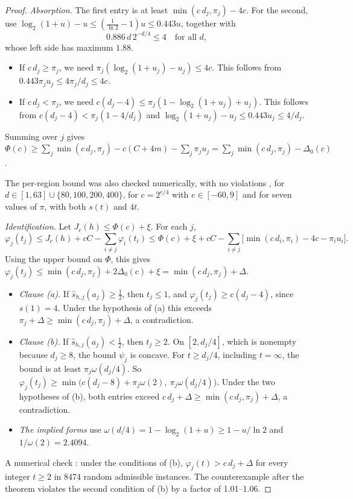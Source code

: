 \begin{proof}
\emph{Absorption.} The first entry is at least $\min(c\,d_j,\pi_j)-4c$. For the second, use $\log_2(1+u)-u\le(\frac1{\ln2}-1)u\le0.443u$, together with
\[
0.886\,d\,2^{-d/4}\le4\quad\text{for all }d,
\]
whose left side has maximum $1.88$.
\begin{itemize}
\item If $c\,d_j\ge\pi_j$, we need $\pi_j(\log_2(1+u_j)-u_j)\le4c$. This follows from $0.443\pi_ju_j\le4\pi_j/d_j\le4c$.
\item If $c\,d_j<\pi_j$, we need $c(d_j-4)\le\pi_j(1-\log_2(1+u_j)+u_j)$. This follows from $c(d_j-4)<\pi_j(1-4/d_j)$ and $\log_2(1+u_j)-u_j\le0.443u_j\le4/d_j$.
\end{itemize}
Summing over $j$ gives $\Phi(c)\ge\sum_j\min(c\,d_j,\pi_j)-c(C+4m)-\sum_j\pi_ju_j=\sum_j\min(c\,d_j,\pi_j)-\Delta_0(c)$.

The per-region bound was also checked numerically, with no violations , for $d\in[1,63]\cup\{80,100,200,400\}$, for $c=2^{e/4}$ with $e\in[-60,9]$ and for seven values of $\pi$, with both $s(t)$ and $4t$.

\emph{Identification.} Let $J_c(h)\le\Phi(c)+\xi$. For each $j$,
\[
\varphi_j(t_j)\le J_c(h)+cC-\sum_{i\neq j}\varphi_i(t_i)\le\Phi(c)+\xi+cC-\sum_{i\neq j}\big[\min(c\,d_i,\pi_i)-4c-\pi_iu_i\big].
\]
Using the upper bound on $\Phi$, this gives $\varphi_j(t_j)\le\min(c\,d_j,\pi_j)+2\Delta_0(c)+\xi=\min(c\,d_j,\pi_j)+\Delta$.
\begin{itemize}
\item \emph{Clause (a).} If $\hat s_{h,j}(a_j)\ge\frac12$, then $t_j\le1$, and $\varphi_j(t_j)\ge c(d_j-4)$, since $s(1)=4$. Under the hypothesis of (a) this exceeds $\pi_j+\Delta\ge\min(c\,d_j,\pi_j)+\Delta$, a contradiction.
\item \emph{Clause (b).} If $\hat s_{h,j}(a_j)<\frac12$, then $t_j\ge2$. On $[2,d_j/4]$, which is nonempty because $d_j\ge8$, the bound $\psi_j$ is concave. For $t\ge d_j/4$, including $t=\infty$, the bound is at least $\pi_j\omega(d_j/4)$. So $\varphi_j(t_j)\ge\min\big(c(d_j-8)+\pi_j\omega(2),\ \pi_j\omega(d_j/4)\big)$. Under the two hypotheses of (b), both entries exceed $c\,d_j+\Delta\ge\min(c\,d_j,\pi_j)+\Delta$, a contradiction.
\item \emph{The implied forms} use $\omega(d/4)=1-\log_2(1+u)\ge1-u/\ln2$ and $1/\omega(2)=2.4094$.
\end{itemize}

A numerical check : under the conditions of (b), $\varphi_j(t)>c\,d_j+\Delta$ for every integer $t\ge2$ in 8474 random admissible instances. The counterexample after the theorem violates the second condition of (b) by a factor of 1.01--1.06.
\end{proof}

